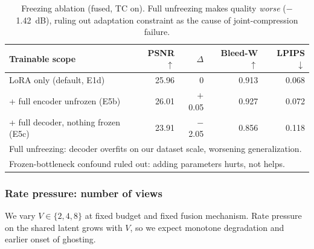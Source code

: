 \begin{table}[t]
\centering
\caption{Freezing ablation (fused, TC on). Full unfreezing makes quality \emph{worse} ($-$1.42~dB), ruling out adaptation constraint as the cause of joint-compression failure.}
\label{tab:unfreeze}
\begin{tabular}{lrrrr}
\toprule
Trainable scope & PSNR $\uparrow$ & $\Delta$ & Bleed-W $\uparrow$ & LPIPS $\downarrow$ \\
\midrule
LoRA only (default, E1d)           & 25.96 & 0       & 0.913 & 0.068 \\
+ full encoder unfrozen (E5b)       & 26.01 & $+$0.05 & 0.927 & 0.072 \\
+ full decoder, nothing frozen (E5c) & 23.91 & $-$2.05 & 0.856 & 0.118 \\
\bottomrule
\multicolumn{5}{l}{\small Full unfreezing: decoder overfits on our dataset scale, worsening generalization.}\\
\multicolumn{5}{l}{\small Frozen-bottleneck confound ruled out: adding parameters hurts, not helps.}\\
\end{tabular}
\end{table}




\subsubsection{Rate pressure: number of views}

We vary $V \in \{2,4,8\}$ at fixed budget and fixed fusion mechanism. Rate pressure on the shared latent grows with $V$, so we expect monotone degradation and earlier onset of ghosting.

